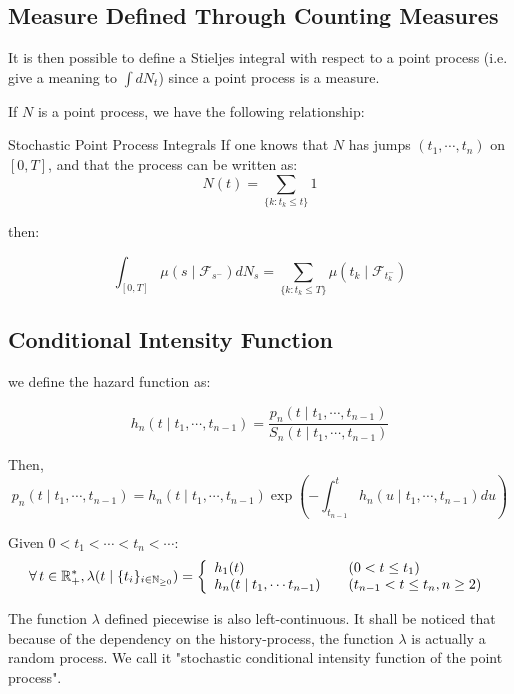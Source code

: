 \subsection{Measure Defined Through Counting Measures}
It is then possible to define a Stieljes integral with respect to a point process (i.e. give a meaning to $\int dN_t$) since a point process is a measure. 

If $N$ is a point process, we have the following relationship:

\begin{theoreme}[label = eq:sum_prod_equiv]{Stochastic Point Process Integrals}
If one knows that $N$ has jumps $(t_1, \cdots, t_n)$ on $[0,T]$, and that the process can be written as:
\begin{equation}
N(t) = \sum_{ \{ k : t_k \leq t \} } 1 
\end{equation}

then:

\begin{equation}
\int_{[0,T]} \mu(s \mid \mathcal F_{s^-} ) d N_s = \sum_{ \{ k : t_k \leq T \} }\mu(t_k \mid \mathcal F_{t_k^-} ) 
\end{equation}  
\end{theoreme}


\subsection{Conditional Intensity Function}
we define the hazard function as:

$$h_n( t \mid t_1, \cdots, t_{n-1} ) = \frac{ p_n ( t \mid t_1, \cdots, t_{n-1} ) } { S_n ( t \mid t_1, \cdots, t_{n-1} ) }$$

Then, 
$$ p_n ( t \mid t_1, \cdots, t_{n-1} ) =  h_n( t \mid t_1, \cdots, t_{n-1} ) \exp \left ( - \int_{t_{n-1}}^t h_n( u \mid t_1, \cdots, t_{n-1} ) du \right ) $$

\begin{definition}
\label{def:lambda_1}
Given $0 < t_1 < \cdots < t_{n} < \cdots $:
\begin{equation}
\forall t \in \R_+^*, \lambda(t \mid \sequence{ t_i } ) = \left\{
    \begin{array}{ll}
            h_1(t) \quad & (0 < t \leq t_1) \\
            h_n(t \mid t_1, \cdots t_{n-1}) \quad & (t_{n-1} < t \leq t_n, n \geq 2) \\
    \end{array}
\right. 
\end{equation}

The function $\lambda$ defined piecewise is also left-continuous. It shall be noticed that because of the dependency on the history-process, the function $\lambda$ is actually a random process. We call it "stochastic conditional intensity function of the point process". 
\end{definition}

